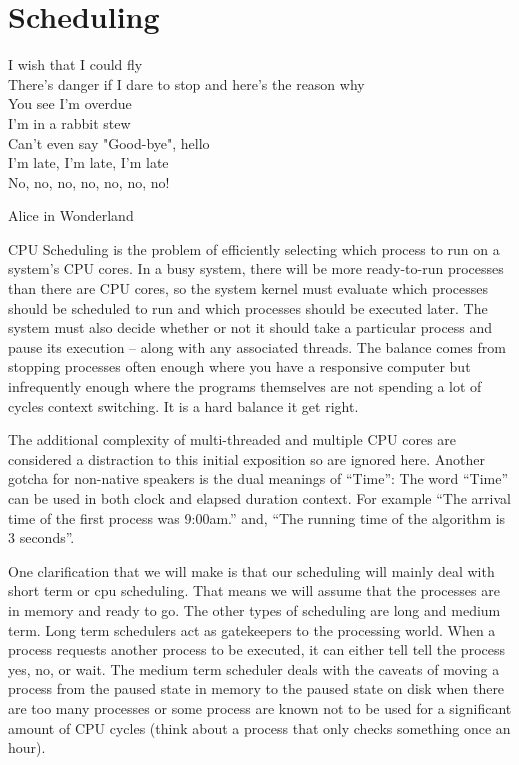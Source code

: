 \chapter{Scheduling}

\epigraph{I wish that I could fly\\
There's danger if I dare to stop and here's the reason why\\
You see I'm overdue\\
I'm in a rabbit stew\\
Can't even say "Good-bye", hello\\
I'm late, I'm late, I'm late\\
No, no, no, no, no, no, no!}{Alice in Wonderland}

CPU Scheduling is the problem of efficiently selecting which process to run on a system's CPU cores. In a busy system, there will be more ready-to-run processes than there are CPU cores, so the system kernel must evaluate which processes should be scheduled to run and which processes should be executed later. The system must also decide whether or not it should take a particular process and pause its execution -- along with any associated threads. The balance comes from stopping processes often enough where you have a responsive computer but infrequently enough where the programs themselves are not spending a lot of cycles context switching. It is a hard balance it get right.

The additional complexity of multi-threaded and multiple CPU cores are considered a distraction to this initial exposition so are ignored here. Another gotcha for non-native speakers is the dual meanings of ``Time'': The word ``Time'' can be used in both clock and elapsed duration context. For example ``The arrival time of the first process was 9:00am.'' and, ``The running time of the algorithm is 3 seconds''.

One clarification that we will make is that our scheduling will mainly deal with short term or cpu scheduling. That means we will assume that the processes are in memory and ready to go. The other types of scheduling are long and medium term. Long term schedulers act as gatekeepers to the processing world. When a process requests another process to be executed, it can either tell tell the process yes, no, or wait. The medium term scheduler deals with the caveats of moving a process from the paused state in memory to the paused state on disk when there are too many processes or some process are known not to be used for a significant amount of CPU cycles (think about a process that only checks something once an hour).


